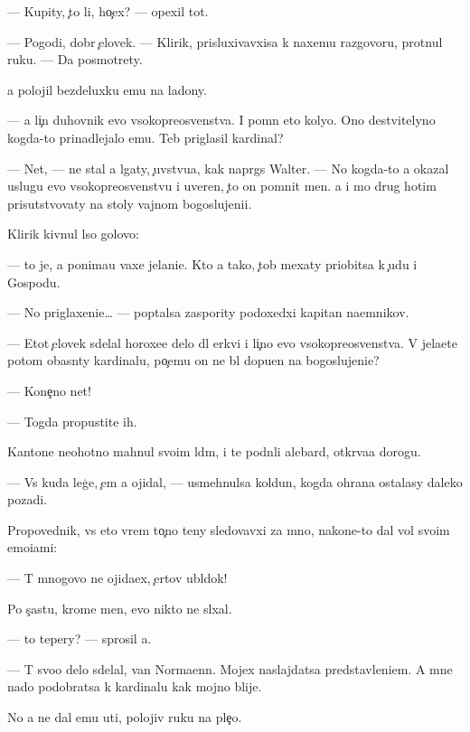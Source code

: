 \documentclass[10pt]{book}
\begin{document}
— Kupity, {\c}to li, ho{\c}ex? — opexil tot.

— Pogodi, dobr{\yi}{\y} {\c}elovek. — Klirik, prisluxivavxi{\y}sa k naxemu razgovoru, prot{\ia}nul ruku. — Da{\y} posmotrety.

{\Y}a polojil bezdeluxku {\y}emu na ladony.

— {\Y}a li{\c}n{\yi}{\y} duhovnik {\y}evo v{\yi}sokopreosv{\ia}{\x}enstva. I pomn{\iu} eto koly{\q}o. Ono de{\y}stvitelyno kogda-to prinadlejalo {\y}emu. Teb{\ia} priglasil kardinal?

— Net, — ne stal {\y}a lgaty, {\c}uvstvu{\y}a, kak napr{\ia}gs{\ia} Walter. — No kogda-to {\y}a okazal uslugu {\y}evo v{\yi}sokopreosv{\ia}{\x}enstvu i uveren, {\c}to on pomnit men{\ia}. {\Y}a i mo{\y} drug hotim prisutstvovaty na stoly vajnom bogoslujeni{\y}i.

Klirik kivnul l{\yi}so{\y} golovo{\y}:

— {\C}to je, {\y}a ponima{\y}u vaxe jelani{\y}e. Kto {\y}a tako{\y}, {\c}tob{\yi} mexaty priob{\x}itsa k {\c}udu i Gospodu.

— No priglaxeni{\y}e… — pop{\yi}talsa zaspority podoxedxi{\y} kapitan na{\y}emnikov.

— Etot {\c}elovek sdelal horoxe{\y}e delo dl{\ia} {\Q}erkvi i li{\c}no {\y}evo v{\yi}sokopreosv{\ia}{\x}enstva. V{\yi} jela{\y}ete potom ob{\y}asn{\ia}ty kardinalu, po{\c}emu on ne b{\yi}l dopu{\x}en na bogoslujeni{\y}e?

— Kone{\c}no net!

— Togda propustite ih.

Kantone{\q} neohotno mahnul svo{\y}im l{\iu}d{\ia}m, i te podn{\ia}li alebard{\yi}, otkr{\yi}va{\y}a dorogu.

— Vs{\e} kuda leg{\c}e, {\c}em {\y}a ojidal, — usmehnulsa koldun, kogda ohrana ostalasy daleko pozadi.

Propovednik, vs{\e} eto vrem{\ia} to{\c}no teny sledovavxi{\y} za mno{\y}, nakone{\q}-to dal vol{\iu} svo{\y}im emo{\q}i{\y}ami:

— T{\yi} mnogovo ne ojida{\y}ex, {\c}ertov ubl{\iu}dok!

Po s{\c}ast{\y}u, krome men{\ia}, {\y}evo nikto ne sl{\yi}xal.

— {\C}to tepery? — sprosil {\y}a.

— T{\yi} svo{\y}o delo sdelal, van Normaenn. Mojex naslajdatsa predstavleni{\y}em. A mne nado podobratsa k kardinalu kak mojno blije.

No {\y}a ne dal {\y}emu u{\y}ti, polojiv ruku na ple{\c}o.
\end{document}
